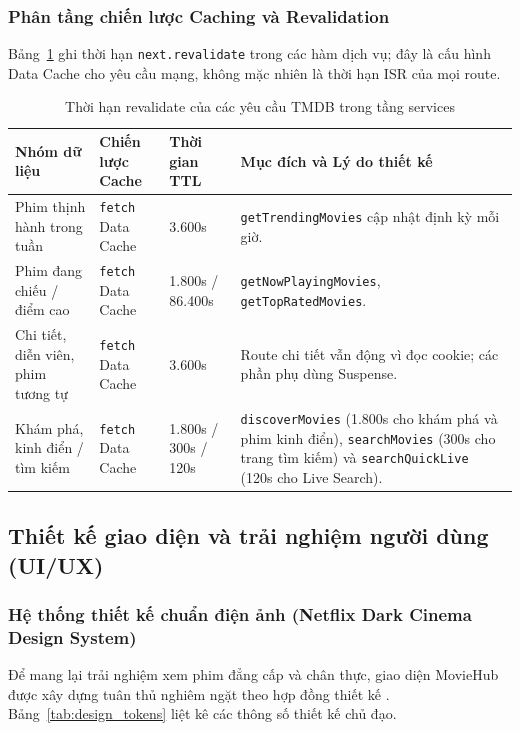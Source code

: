 \documentclass[12pt,a4paper]{extarticle}
\begin{document}
\subsubsection{Phân tầng chiến lược Caching và Revalidation}
Bảng~\ref{tab:caching_strategy} ghi thời hạn \texttt{next.revalidate} trong các hàm dịch vụ; đây là cấu hình Data Cache cho yêu cầu mạng, không mặc nhiên là thời hạn ISR của mọi route.

\begin{table}[H]
\centering
\caption{Thời hạn revalidate của các yêu cầu TMDB trong tầng services}
\label{tab:caching_strategy}
\begin{tabularx}{\textwidth}{>{\raggedright\arraybackslash}p{3.2cm}>{\raggedright\arraybackslash}p{2.8cm}>{\raggedright\arraybackslash}p{2.5cm}>{\raggedright\arraybackslash}X}
\toprule
\textbf{Nhóm dữ liệu} & \textbf{Chiến lược Cache} & \textbf{Thời gian TTL} & \textbf{Mục đích và Lý do thiết kế} \\
\midrule
Phim thịnh hành trong tuần & \texttt{fetch} Data Cache & 3.600s & \texttt{getTrendingMovies} cập nhật định kỳ mỗi giờ. \\
Phim đang chiếu / điểm cao & \texttt{fetch} Data Cache & 1.800s / 86.400s & \texttt{getNowPlayingMovies}, \texttt{getTopRatedMovies}. \\
Chi tiết, diễn viên, phim tương tự & \texttt{fetch} Data Cache & 3.600s & Route chi tiết vẫn động vì đọc cookie; các phần phụ dùng Suspense. \\
Khám phá, kinh điển / tìm kiếm & \texttt{fetch} Data Cache & 1.800s / 300s / 120s & \texttt{discoverMovies} (1.800s cho khám phá và phim kinh điển), \texttt{searchMovies} (300s cho trang tìm kiếm) và \texttt{searchQuickLive} (120s cho Live Search). \\
\bottomrule
\end{tabularx}
\end{table}

\subsection{Thiết kế giao diện và trải nghiệm người dùng (UI/UX)}

\subsubsection{Hệ thống thiết kế chuẩn điện ảnh (Netflix Dark Cinema Design System)}
Để mang lại trải nghiệm xem phim đẳng cấp và chân thực, giao diện MovieHub được xây dựng tuân thủ nghiêm ngặt theo hợp đồng thiết kế . Bảng~\ref{tab:design_tokens} liệt kê các thông số thiết kế chủ đạo.
\end{document}
